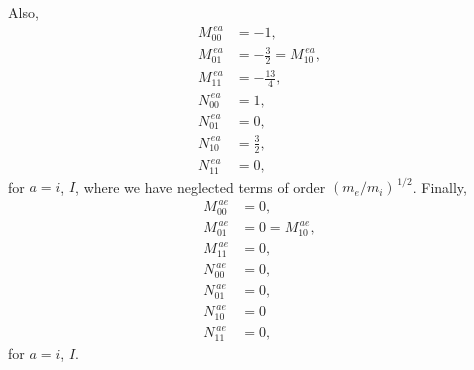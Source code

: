 \documentclass[notitlepage,12pt]{article}
\begin{document}
Also,
\begin{align}
M^{\,ea}_{00} &= -1,\\[0.5ex]
M^{\,ea}_{01}&= -\frac{3}{2}= M^{\,ea}_{10},\\[0.5ex]
M^{\,ea}_{11}& = -\frac{13}{4},\\[0.5ex]
N^{\,ea}_{00} &= 1,\\[0.5ex]
N^{\,ea}_{01}&= 0,\\[0.5ex]
N^{\,ea}_{10}&=\frac{3}{2},\\[0.5ex]
N^{\,ea}_{11}& =0,
\end{align}
for $a=i$, $I$, where we have neglected terms of order $(m_e/m_i)^{\,1/2}$. Finally,
\begin{align}
M^{\,ae}_{00} &= 0,\\[0.5ex]
M^{\,ae}_{01}&=0= M^{\,ae}_{10},\\[0.5ex]
M^{\,ae}_{11}& = 0,\\[0.5ex]
N^{\,ae}_{00} &= 0,\\[0.5ex]
N^{\,ae}_{01}&= 0,\\[0.5ex]
N^{\,ae}_{10}&=0\\[0.5ex]
N^{\,ae}_{11}& =0,
\end{align}
for $a=i$, $I$. 
\end{document}
